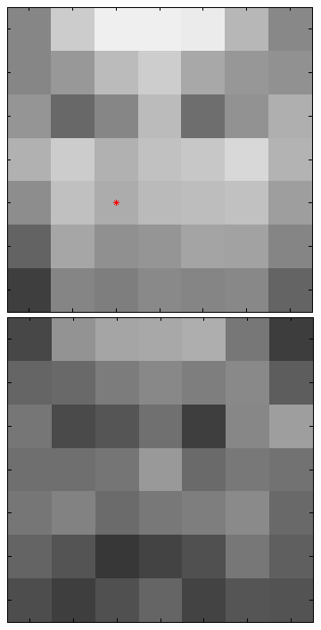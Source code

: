 \begin{figure}[ht]
 \includegraphics[width=\textwidth*11/100]{ch5/figures/XM2VTS_2_2.png}
 \includegraphics[width=\textwidth*11/100]{ch5/figures/XM2VTS_3_2.png}

\end{figure}

